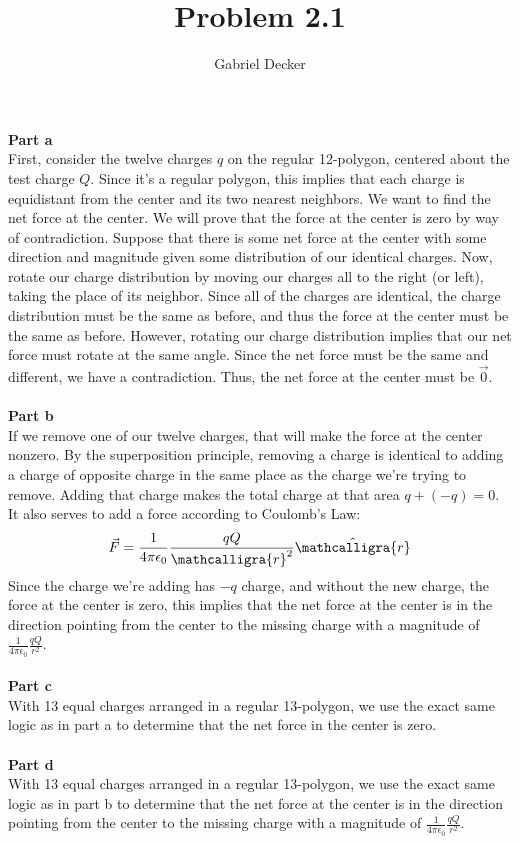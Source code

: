 \documentclass[12pt]{article}
\title{Problem 2.1}
\author{Gabriel Decker}
\newcommand{\ds}{\displaystyle}
\newcommand{\scripty}[1]{\ensuremath{\mathcalligra{#1}}}
\begin{document}
\maketitle
\begin{flushleft}

\textbf{Part a}\\
First, consider the twelve charges $q$ on the regular 12-polygon, centered about the test charge $Q$.
Since it's a regular polygon, this implies that each charge is equidistant from the center and its two nearest neighbors.
We want to find the net force at the center.
We will prove that the force at the center is zero by way of contradiction.
Suppose that there is some net force at the center with some direction and magnitude given some distribution of our identical charges.
Now, rotate our charge distribution by moving our charges all to the right (or left), taking the place of its neighbor.
Since all of the charges are identical, the charge distribution must be the same as before, and thus the force at the center must be the same as before.
However, rotating our charge distribution implies that our net force must rotate at the same angle.
Since the net force must be the same and different, we have a contradiction.
Thus, the net force at the center must be $\vec{0}$.\\~\\

\textbf{Part b}\\
If we remove one of our twelve charges, that will make the force at the center nonzero.
By the superposition principle, removing a charge is identical to adding a charge of opposite charge in the same place as the charge we're trying to remove.
Adding that charge makes the total charge at that area $q+(-q)=0$.
It also serves to add a force according to Coulomb's Law:
$$\vec{F}=\frac{1}{4\pi\epsilon_0}\frac{qQ}{\scripty{r}^2}\hat{\scripty{r}}$$
Since the charge we're adding has $-q$ charge, and without the new charge, the force at the center is zero, this implies that the net force at the center is in the direction pointing from the center to the missing charge with a magnitude of $\ds\frac{1}{4\pi\epsilon_0}\frac{qQ}{r^2}$.\\~\\


\textbf{Part c}\\
With 13 equal charges arranged in a regular 13-polygon, we use the exact same logic as in part a to determine that the net force in the center is zero.\\~\\

\textbf{Part d}\\
With 13 equal charges arranged in a regular 13-polygon, we use the exact same logic as in part b to determine that the net force at the center is in the direction pointing from the center to the missing charge with a magnitude of $\ds\frac{1}{4\pi\epsilon_0}\frac{qQ}{r^2}$.\\~\\



\end{flushleft}
\end{document}

